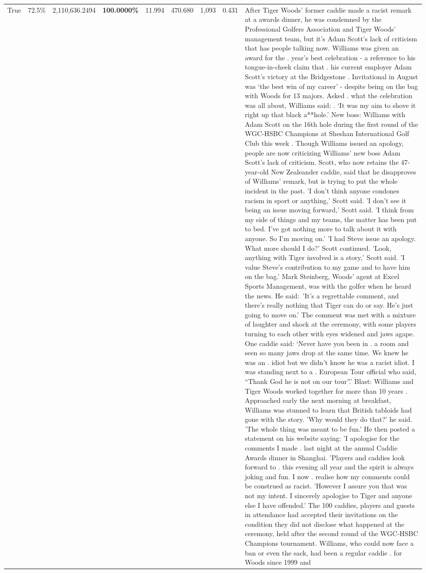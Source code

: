 \begin{table}[H]
\begin{tabular}{lllrlllll}
True & 72.5\% & 2,110,636.2494 & \bfseries \color{red} 100.0000\% & 11.994 & 470.680 & 1,093 & 0.431 & After Tiger Woods' former caddie made a racist remark at a awards dinner, he was condemned by the Professional Golfers Association and Tiger Woods' management team, but it's Adam Scott's lack of criticism that has people talking now. Williams was given an award for the . year’s best celebration - a reference to his tongue-in-cheek claim that . his current employer Adam Scott’s victory at the Bridgestone . Invitational in August was ‘the best win of my career’ - despite being on the bag with Woods for 13 majors. Asked . what the celebration was all about, Williams said: . ‘It was my aim to shove it right up that black a**hole.’ New boss: Williams with Adam Scott  on the 16th hole during the first round of the WGC-HSBC Champions at Sheshan International Golf Club this week . Though Williams issued an apology, people are now criticizing Williams' new boss Adam Scott's lack of criticism. Scott, who now retains the 47-year-old New Zealeander caddie, said that he disapproves of Williams' remark, but is trying to put the whole incident in the past. 'I don't think anyone condones racism in sport or anything,' Scott said. 'I don't see it being an issue moving forward,' Scott said. 'I think from my side of things and my teams, the matter has been put to bed. I've got nothing more to talk about it with anyone. So I'm moving on.' 'I had Steve issue an apology. What more should I do?' Scott continued. 'Look, anything with Tiger involved is a story,' Scott said. 'I value Steve's contribution to my game and to have him on the bag.' Mark Steinberg, Woods' agent at Excel Sports Management, was with the golfer when he heard the news. He said: 'It's a regrettable comment, and there's really nothing that Tiger can do or say. He's just going to move on.' The comment was met with a mixture of laughter and shock at the ceremony, with some players turning to each other with eyes widened and jaws agape. One caddie said: ‘Never have you been in . a room and seen so many jaws drop at the same time. We knew he was an . idiot but we didn’t know he was a racist idiot. I was standing next to a . European Tour official who said, “Thank God he is not on our tour”.’ Blast: Williams and Tiger Woods worked together for more than 10 years . Approached early the next morning at breakfast, Williams was stunned to learn that British tabloids had gone with the story. 'Why would they do that?' he said. 'The whole thing was meant to be fun.' He then posted a statement on his website saying: 'I apologise for the comments I made . last night at the annual Caddie Awards dinner in Shanghai. 'Players and caddies look forward to . this evening all year and the spirit is always joking and fun. I now . realise how my comments could be construed as racist. 'However I assure you that was not my intent. I sincerely apologise to Tiger and anyone else I have offended.' The 100 caddies, players and guests in attendance had accepted their invitations on the condition they did not disclose what happened at the ceremony, held after the second round of the WGC-HSBC Champions tournament. Williams, who could now face a ban or even the sack, had been a regular caddie . for Woods since 1999 and 
\end{tabular}
\end{table}
